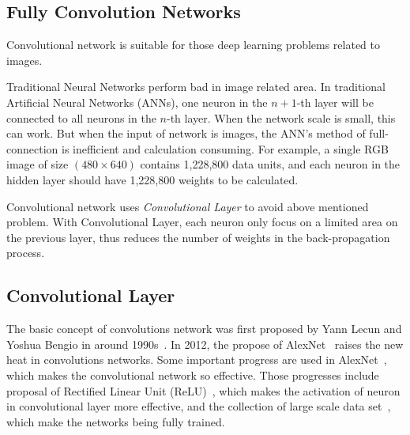 \begin{spacing}{1.5}
\section{Fully Convolution Networks}
\label{sec:LR_FCN}

Convolutional network is suitable for those deep learning problems related to images.

Traditional Neural Networks perform bad in image related area. In traditional Artificial Neural Networks (ANNs), one neuron in the $n+1$-th layer will be connected to all neurons in the $n$-th layer. When the network scale is small, this can work. But when the input of network is images, the ANN's method of full-connection is inefficient and calculation consuming. For example, a single RGB image of size $(480 \times 640)$ contains 1,228,800 data units, and each neuron in the hidden layer should have 1,228,800 weights to be calculated.

Convolutional network uses \textit{Convolutional Layer} to avoid above mentioned problem. With Convolutional Layer, each neuron only focus on a limited area on the previous layer, thus reduces the number of weights in the back-propagation process.

\subsection{Convolutional Layer}

The basic concept of convolutions network was first proposed by Yann Lecun and Yoshua Bengio in around 1990s~\cite{bengio1997convolutional, lecun1989backpropagation}. In 2012, the propose of AlexNet~\cite{krizhevsky2012imagenet} raises the new heat in convolutions networks. Some important progress are used in AlexNet~\cite{kaiming2014learning}, which makes the convolutional network so effective. Those progresses include proposal of Rectified Linear Unit (ReLU)~\cite{nair2010rectified}, which makes the activation of neuron in convolutional layer more effective, and the collection of large scale data set~\cite{deng2009imagenet}, which make the networks being fully trained.



\end{spacing}
